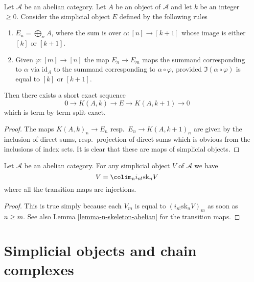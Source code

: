 \begin{lemma}
\label{lemma-extension}
Let $\mathcal{A}$ be an abelian category.
Let $A$ be an object of $\mathcal{A}$ and
let $k$ be an integer $\geq 0$. Consider the
simplicial object $E$ defined by the following rules
\begin{enumerate}
\item $E_n = \bigoplus_\alpha A$, where the
sum is over $\alpha : [n] \to [k + 1]$ whose
image is either $[k]$ or $[k + 1]$.
\item Given $\varphi : [m] \to [n]$ the map
$E_n \to E_m$ maps the summand corresponding
to $\alpha$ via $\text{id}_A$ to the summand
corresponding to $\alpha \circ \varphi$,
provided $\Im(\alpha \circ \varphi)$
is equal to $[k]$ or $[k + 1]$.
\end{enumerate}
Then there exists a short exact sequence
$$
0 \to K(A, k) \to E \to K(A, k + 1) \to 0
$$
which is term by term split exact.
\end{lemma}

\begin{proof}
The maps $K(A, k)_n \to E_n$ resp.\ $E_n \to K(A, k + 1)_n$
are given by the inclusion of direct sums, resp.\ projection
of direct sums which is obvious from the inclusions of index
sets. It is clear that these are maps of simplicial
objects.
\end{proof}

\begin{lemma}
\label{lemma-abelian-limit-skeleta}
Let $\mathcal{A}$ be an abelian category.
For any simplicial object $V$ of $\mathcal{A}$ we have
$$
V = \colim_n i_{n!}\text{sk}_n V
$$
where all the transition maps are injections.
\end{lemma}

\begin{proof}
This is true simply because each $V_m$ is
equal to $(i_{n!}\text{sk}_n V)_m$ as
soon as $n \geq m$. See also Lemma \ref{lemma-n-skeleton-abelian}
for the transition maps.
\end{proof}

\section{Simplicial objects and chain complexes}
\label{section-complexes}

